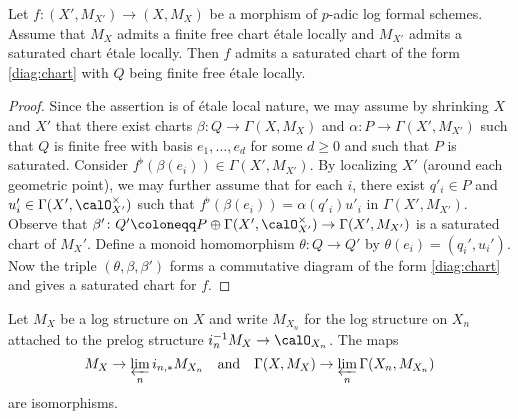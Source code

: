 \begin{lem}\label{lem:existence of saturated chart for finite free log structure}
    Let $f\colon (X',M_{X'})\rightarrow (X,M_X)$ be a morphism of $p$-adic log formal schemes. Assume that $M_X$ admits a finite free chart \'etale locally and $M_{X'}$ admits a saturated chart \'etale locally. Then $f$ admits a saturated chart of the form  \eqref{diag:chart} with $Q$ being finite free \'etale locally.
\end{lem}

\begin{proof}
    Since the assertion is of \'etale local nature, we may assume by shrinking $X$ and $X'$ that there exist charts $\beta\colon Q\rightarrow \Gamma(X,M_X)$ and $\alpha\colon P\rightarrow \Gamma(X',M_{X'})$ such that $Q$ is finite free with basis $e_1,\ldots,e_d$ for some $d\geq 0$ and such that $P$ is saturated. Consider $f^\flat(\beta(e_i))\in \Gamma(X',M_{X'})$. By localizing $X'$ (around each geometric point), we may further assume that for each $i$, there exist $q'_i\in P$ and $u'_i\in \Gamma(X',\calO_{X'}^\times)$ such that $f^\flat(\beta(e_i))=\alpha(q'_i) u'_i$ in $\Gamma(X',M_{X'})$. Observe that $\beta'\colon Q'\coloneqq P\oplus \Gamma(X',\calO_{X'}^\times)\rightarrow \Gamma(X',M_{X'})$ is a saturated chart of $M_X'$. Define a monoid homomorphism $\theta\colon Q\rightarrow Q'$ by $\theta(e_i)=(q_i',u_i')$. Now the triple $(\theta, \beta,\beta')$ forms a commutative diagram of the form \eqref{diag:chart} and gives a saturated chart for $f$.
\end{proof}


\begin{prop}\label{lem:log structure on formal scheme as inverse limit}
Let $M_X$ be a log structure on $X$ and write $M_{X_n}$ for the log structure on $X_n$ attached to the prelog structure $i_n^{-1}M_X\rightarrow \calO_{X_n}$.
The maps 
\[
M_X\rightarrow \varprojlim_n i_{n,\ast}M_{X_n}\quad\text{and} \quad\Gamma(X,M_X) \rightarrow \varprojlim_n\Gamma(X_n,M_{X_n})
\]
are isomorphisms.
\end{prop}



